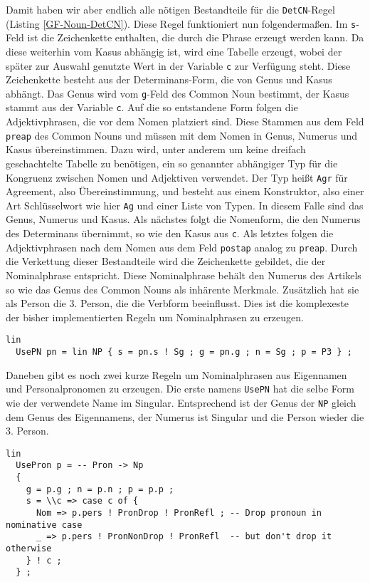 Damit haben wir aber endlich alle nötigen Bestandteile für die \texttt{DetCN}-Regel (Listing \ref{GF-Noun-DetCN}). Diese Regel funktioniert nun folgendermaßen. Im \texttt{s}-Feld ist die Zeichenkette enthalten, die durch die Phrase erzeugt werden kann. Da diese weiterhin vom Kasus abhängig ist, wird eine Tabelle erzeugt, wobei der später zur Auswahl genutzte Wert in der Variable \texttt{c} zur Verfügung steht. Diese Zeichenkette besteht aus der Determinans-Form, die von Genus und Kasus abhängt. Das Genus wird vom \texttt{g}-Feld des Common Noun bestimmt, der Kasus stammt aus der Variable \texttt{c}. Auf die so entstandene Form folgen die Adjektivphrasen, die vor dem Nomen platziert sind. Diese Stammen aus dem Feld \texttt{preap} des Common Nouns und müssen mit dem Nomen in Genus, Numerus und Kasus übereinstimmen. Dazu wird, unter anderem um keine dreifach geschachtelte Tabelle zu benötigen, ein so genannter abhängiger Typ für die Kongruenz zwischen Nomen und Adjektiven verwendet. Der Typ heißt \texttt{Agr} für Agreement, also Übereinstimmung, und besteht aus einem Konstruktor, also einer Art Schlüsselwort wie hier \texttt{Ag} und einer Liste von Typen. In diesem Falle sind das Genus, Numerus und Kasus.
Als nächstes folgt die Nomenform, die den Numerus des Determinans übernimmt, so wie den Kasus aus \texttt{c}. Als letztes folgen die Adjektivphrasen nach dem Nomen aus dem Feld \texttt{postap} analog zu \texttt{preap}. Durch die Verkettung dieser Bestandteile wird die Zeichenkette gebildet, die der Nominalphrase entspricht. Diese Nominalphrase behält den Numerus des Artikels so wie das Genus des Common Nouns als inhärente Merkmale. Zusätzlich hat sie als Person die 3. Person, die die Verbform beeinflusst. Dies ist die komplexeste der bisher implementierten Regeln um Nominalphrasen zu erzeugen. \par
\begin{lstlisting}[float=h!tp,caption={Die Syntaxregel \texttt{UsePN}, um einen Eigennamen als \texttt{NP} zu verwenden (vgl. \textbf{NounLat.gf}},label={GF-Noun-UsePN}]
lin
  UsePN pn = lin NP { s = pn.s ! Sg ; g = pn.g ; n = Sg ; p = P3 } ;
\end{lstlisting}
Daneben gibt es noch zwei kurze Regeln um Nominalphrasen aus Eigennamen und Personalpronomen zu erzeugen. Die erste namens \texttt{UsePN} hat die selbe Form wie der verwendete Name im Singular. Entsprechend ist der Genus der \texttt{NP} gleich dem Genus des Eigennamens, der Numerus ist Singular und die Person wieder die 3. Person. \par
\begin{lstlisting}[float=h!tp,caption={Die Syntaxregel \texttt{UsePN}, um ein Personalpronomen als \texttt{NP} zu verwenden (vgl. \textbf{NounLat.gf}},label={GF-Noun-UsePN}]
lin
  UsePron p = -- Pron -> Np
  { 
    g = p.g ; n = p.n ; p = p.p ;
    s = \\c => case c of { 
      Nom => p.pers ! PronDrop ! PronRefl ; -- Drop pronoun in nominative case
      _ => p.pers ! PronNonDrop ! PronRefl  -- but don't drop it otherwise
    } ! c ;
  } ;
\end{lstlisting}
